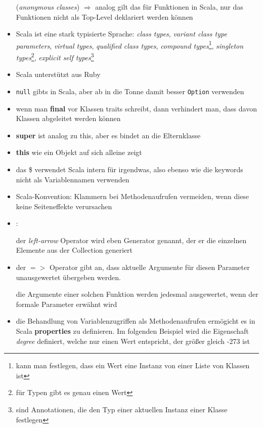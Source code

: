 \begin{itemize}
  (\textit{anonymous classes}) $\Rightarrow$ analog gilt das für Funktionen
  in Scala, nur das Funktionen nicht als Top-Level deklariert werden können
  \item Scala ist eine stark typisierte Sprache: \textit{class types},
  \textit{variant class type parameters}, \textit{virtual types}, 
  \textit{qualified class types},  \textit{compound types}\footnote{kann
  man festlegen, dass ein Wert eine Instanz von einer Liste von Klassen
  ist}, \textit{singleton types}\footnote{für Typen gibt es genau einen
  Wert}, \textit{explicit self types}\footnote{sind Annotationen, die den Typ 
  einer aktuellen Instanz einer Klasse festlegen}
  \item Scala unterstützt  aus Ruby
  \item \texttt{null} gibts in Scala, aber ab in die Tonne damit \und 
  besser \texttt{Option} verwenden
  \item wenn man \textbf{final} vor Klassen \oder traits schreibt, dann
  verhindert man, dass davon Klassen abgeleitet werden können
  \item \textbf{super} ist analog zu this, aber es bindet an die Elternklasse
  \item \textbf{this} wie ein Objekt auf sich alleine zeigt
  \item das \$ verwendet Scala intern für irgendwas, also ebenso wie
  die keywords nicht als Variablennamen verwenden
  \item Scala-Konvention: Klammern bei Methodenaufrufen vermeiden, wenn
  diese keine Seiteneffekte verursachen
  \item {}:
  
  
  
  der \textit{left-arrow} Operator wird eben Generator genannt, der er die
  einzelnen Elemente aus der Collection generiert
  \item der $=>$ Operator gibt an, dass aktuelle Argumente für diesen Parameter
  unausgewertet übergeben werden.
    
  die Argumente einer solchen Funktion werden jedesmal ausgewertet, wenn der
  formale Parameter erwähnt wird
  
    
  \item die Behandlung von Variablenzugriffen als Methodenaufrufen ermögicht
  es in Scala \textbf{properties} zu definieren. Im folgenden Beispiel wird
  die Eigenschaft \textit{degree} definiert, welche nur einen Wert entspricht,
  der größer \oder gleich -273 ist
  

\end{itemize}

